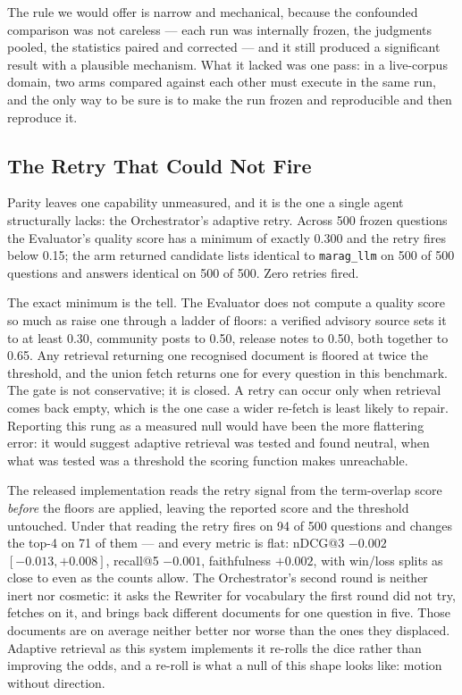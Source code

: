 \documentclass[10pt,conference]{IEEEtran}
\begin{document}
The rule we would offer is narrow and mechanical, because the confounded
comparison was not careless --- each run was internally frozen, the judgments
pooled, the statistics paired and corrected --- and it still produced a significant
result with a plausible mechanism. What it lacked was one pass: in a live-corpus
domain, two arms compared against each other must execute in the same run, and the
only way to be sure is to make the run frozen and reproducible and then reproduce
it.

\subsection{The Retry That Could Not Fire}\label{sec:retry}

Parity leaves one capability unmeasured, and it is the one a single agent
structurally lacks: the Orchestrator's adaptive retry. Across 500 frozen
questions the Evaluator's quality score has a minimum of exactly 0.300 and the
retry fires below 0.15; the arm returned candidate lists identical to
\texttt{marag\_llm} on 500 of 500 questions and answers identical on 500 of 500.
Zero retries fired.

The exact minimum is the tell. The Evaluator does not compute a quality score so
much as raise one through a ladder of floors: a verified advisory source sets it
to at least 0.30, community posts to 0.50, release notes to 0.50, both together
to 0.65. Any retrieval returning one recognised document is floored at twice the
threshold, and the union fetch returns one for every question in this benchmark.
The gate is not conservative; it is closed. A retry can occur only when
retrieval comes back empty, which is the one case a wider re-fetch is least
likely to repair. Reporting this rung as a measured null would have been the
more flattering error: it would suggest adaptive retrieval was tested and found
neutral, when what was tested was a threshold the scoring function makes
unreachable.

The released implementation reads the retry signal from the term-overlap score
\emph{before} the floors are applied, leaving the reported score and the
threshold untouched. Under that reading the retry fires on 94 of 500 questions
and changes the top-4 on 71 of them --- and every metric is flat: nDCG@3
$-0.002$ $[-0.013,+0.008]$, recall@5 $-0.001$, faithfulness $+0.002$, with
win/loss splits as close to even as the counts allow. The Orchestrator's second
round is neither inert nor cosmetic: it asks the Rewriter for vocabulary the
first round did not try, fetches on it, and brings back different documents for
one question in five. Those documents are on average neither better nor worse
than the ones they displaced. Adaptive retrieval as this system implements it
re-rolls the dice rather than improving the odds, and a re-roll is what a null of
this shape looks like: motion without direction.
\end{document}
